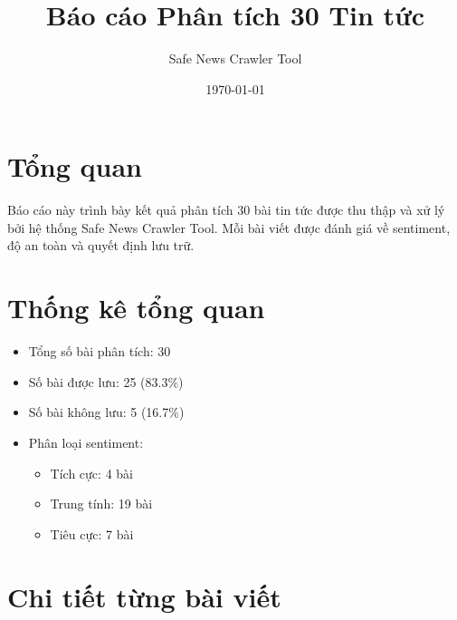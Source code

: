 \documentclass[12pt,a4paper]{article}
\title{Báo cáo Phân tích 30 Tin tức}
\author{Safe News Crawler Tool}
\date{\today}
\begin{document}
\maketitle

\section{Tổng quan}
Báo cáo này trình bày kết quả phân tích 30 bài tin tức được thu thập và xử lý bởi hệ thống Safe News Crawler Tool. Mỗi bài viết được đánh giá về sentiment, độ an toàn và quyết định lưu trữ.

\section{Thống kê tổng quan}
\begin{itemize}
    \item Tổng số bài phân tích: 30
    \item Số bài được lưu: 25 (83.3\%)
    \item Số bài không lưu: 5 (16.7\%)
    \item Phân loại sentiment:
    \begin{itemize}
        \item Tích cực: 4 bài
        \item Trung tính: 19 bài
        \item Tiêu cực: 7 bài
    \end{itemize}
\end{itemize}

\section{Chi tiết từng bài viết}
\end{document}
